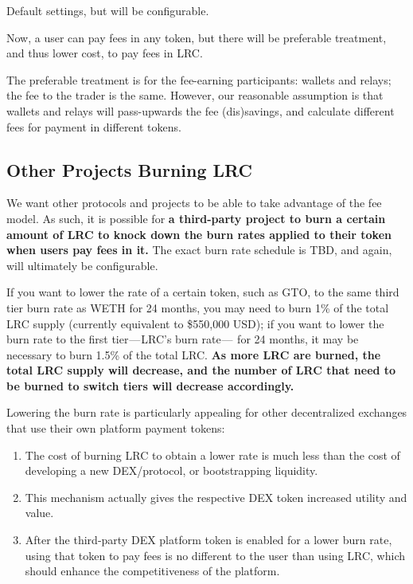 \documentclass[UTF8,nofonts]{article}
\makeatletter
\newenvironment{figurehere}
 {\def\@captype{figure}}
 {}
\makeatother
\begin{document}
\begin{multicols}{2}
\begin{appendices}
\begin{center}
\begin{figurehere}
\caption{Default settings, but will be configurable.}
\end{figurehere}
\end{center}


Now, a user can pay fees in any token, but there will be preferable treatment, and thus lower cost, to pay fees in LRC. 

The preferable treatment is for the fee-earning participants: wallets and relays; the fee to the trader is the same. However, our reasonable assumption is that wallets and relays will pass-upwards the fee (dis)savings, and calculate different fees for payment in different tokens. 

\subsection{Other Projects Burning LRC}
We want other protocols and projects to be able to take advantage of the fee model. As such, it is possible for \textbf{a third-party project to burn a certain amount of LRC to knock down the burn rates applied to their token when users pay fees in it.} The exact burn rate schedule is TBD, and again, will ultimately be configurable.

If you want to lower the rate of a certain token, such as GTO, to the same third tier burn rate as WETH for 24 months, you may need to burn 1\% of the total LRC supply (currently equivalent to \$550,000 USD); if you want to lower the burn rate to the first tier — LRC’s burn rate —  for 24 months, it may be necessary to burn 1.5\% of the total LRC. \textbf{As more LRC are burned, the total LRC supply will decrease, and the number of LRC that need to be burned to switch tiers will decrease accordingly.}

Lowering the burn rate is particularly appealing for other decentralized exchanges that use their own platform payment tokens:

\begin{enumerate}
	\item The cost of burning LRC to obtain a lower rate is much less than the cost of developing a new DEX/protocol, or bootstrapping liquidity. 
	\item This mechanism actually gives the respective DEX token increased utility and value. 
	\item After the third-party DEX platform token is enabled for a lower burn rate, using that token to pay fees is no different to the user than using LRC, which should enhance the competitiveness of the platform.
\end{enumerate}



\end{appendices}
\end{multicols}
\end{document}
